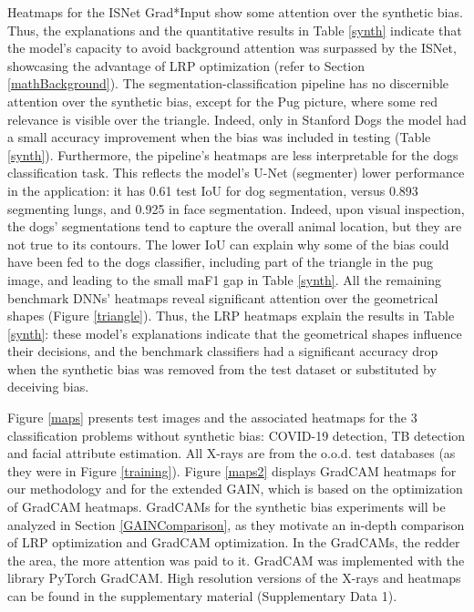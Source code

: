 \documentclass[fleqn,10pt]{wlscirep}
\begin{document}
{Heatmaps for the ISNet Grad*Input show some attention over the synthetic bias. Thus, the explanations and the quantitative results in Table \ref{synth} indicate that the model's capacity to avoid background attention was surpassed by the ISNet, showcasing the advantage of LRP optimization (refer to Section \ref{mathBackground}). The segmentation-classification pipeline has no discernible attention over the synthetic bias, except for the Pug picture, where some red relevance is visible over the triangle. Indeed, only in Stanford Dogs the model had a small accuracy improvement when the bias was included in testing (Table \ref{synth}). Furthermore, the pipeline's heatmaps are less interpretable for the dogs classification task. This reflects the model's U-Net (segmenter) lower performance in the application: it has 0.61 test IoU for dog segmentation, versus 0.893 segmenting lungs, and 0.925 in face segmentation. Indeed, upon visual inspection, the dogs' segmentations tend to capture the overall animal location, but they are not true to its contours. The lower IoU can explain why some of the bias could have been fed to the dogs classifier, including part of the triangle in the pug image, and leading to the small maF1 gap in Table \ref{synth}. All the remaining benchmark DNNs' heatmaps reveal significant attention over the geometrical shapes (Figure \ref{triangle}). Thus, the LRP heatmaps explain the results in Table \ref{synth}: these model's explanations indicate that the geometrical shapes influence their decisions, and the benchmark classifiers had a significant accuracy drop when the synthetic bias was removed from the test dataset or substituted by deceiving bias.

Figure \ref{maps} presents test images and the associated heatmaps for the 3 classification problems without synthetic bias: COVID-19 detection, TB detection and facial attribute estimation. All X-rays are from the o.o.d. test databases (as they were in Figure \ref{training}). Figure \ref{maps2} displays GradCAM heatmaps for our methodology and for the extended GAIN, which is based on the optimization of GradCAM heatmaps. GradCAMs for the synthetic bias experiments will be analyzed in Section \ref{GAINComparison}, as they motivate an in-depth comparison of LRP optimization and GradCAM optimization. In the GradCAMs, the redder the area, the more attention was paid to it. GradCAM was implemented with the library PyTorch GradCAM\cite{GradCAMTorch}. High resolution versions of the X-rays and heatmaps can be found in the supplementary material (Supplementary Data 1).


}
\end{document}
